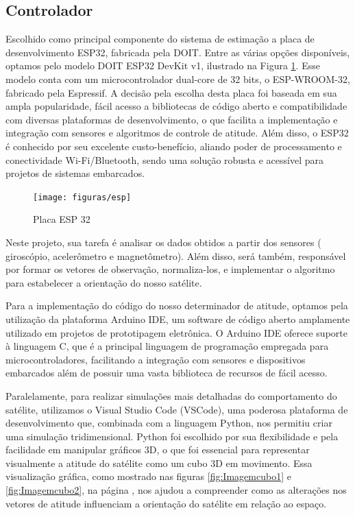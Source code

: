 \documentclass[
	12pt,				%
	openright,			%
	oneside,			%
	a4paper,			%
	english,			%
	brazil				%
	]{abntex2}
\begin{document}
\subsection{Controlador}


Escolhido como principal componente do sistema de estimação a placa de desenvolvimento ESP32, fabricada pela DOIT. Entre as várias opções disponíveis, optamos pelo modelo DOIT ESP32 DevKit v1, ilustrado na Figura \ref{fig:esp}. Esse modelo conta com um microcontrolador dual-core de 32 bits, o ESP-WROOM-32, fabricado pela Espressif. A decisão pela escolha desta placa foi baseada em sua ampla popularidade, fácil acesso a bibliotecas de código aberto e compatibilidade com diversas plataformas de desenvolvimento, o que facilita a implementação e integração com sensores e algoritmos de controle de atitude. Além disso, o ESP32 é conhecido por seu excelente custo-benefício, aliando poder de processamento e conectividade Wi-Fi/Bluetooth, sendo uma solução robusta e acessível para projetos de sistemas embarcados.

\begin{figure}[h]
	\centering
	\texttt{[image: figuras/esp]}
	\caption[ESP32]{Placa ESP 32}
	\label{fig:esp}
\end{figure}

Neste projeto, sua tarefa é analisar os dados obtidos a partir dos sensores ( giroscópio, acelerômetro e magnetômetro). Além disso, será também, responsável por formar os vetores de observação, normaliza-los, e implementar o algoritmo para estabelecer a orientação do nosso satélite.

Para a implementação do código do nosso determinador de atitude, optamos pela utilização da plataforma Arduino IDE, um software de código aberto amplamente utilizado em projetos de prototipagem eletrônica. O Arduino IDE oferece suporte à linguagem C, que é a principal linguagem de programação empregada para microcontroladores, facilitando a integração com sensores e dispositivos embarcados além de possuir uma vasta biblioteca de recursos de fácil acesso. 

Paralelamente, para realizar simulações mais detalhadas do comportamento do satélite, utilizamos o Visual Studio Code (VSCode), uma poderosa plataforma de desenvolvimento que, combinada com a linguagem Python, nos permitiu criar uma simulação tridimensional. Python foi escolhido por sua flexibilidade e pela facilidade em manipular gráficos 3D, o que foi essencial para representar visualmente a atitude do satélite como um cubo 3D em movimento. Essa visualização gráfica, como mostrado nas figuras \ref{fig:Imagemcubo1} e \ref{fig:Imagemcubo2}, na página \pageref{fig:Imagemcubo1}, nos ajudou a compreender como as alterações nos vetores de atitude influenciam a orientação do satélite em relação ao espaço.
\end{document}
